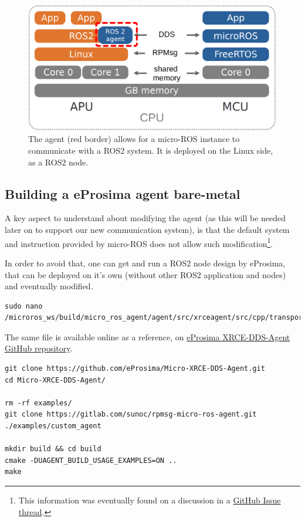 \documentclass[10pt]{article}
\begin{document}
\begin{figure}[htbp]
\centering
\includegraphics[width=.6\textwidth]{./img/map_agent.png}
\caption{\label{fig:orgf98847f}The agent (red border) allows for a micro-ROS instance to communicate with a ROS2 system. It is deployed on the Linux side, as a ROS2 node.}
\end{figure}


\subsection{Building a eProsima agent bare-metal}
\label{sec:org75a5446}
A key aspect to understand about modifying the agent (as
this will be needed later on to support our new communication system),
is that the default system and instruction provided by micro-ROS does not
allow such modification\footnote{This information was eventually found on a discussion in a \href{https://github.com/micro-ROS/micro\_ros\_setup/issues/591}{GitHub Issue thread}.}.

In order to avoid that, one can get and run a ROS2 node design by eProsima,
that can be deployed on it's own (without other ROS2 application and nodes)
and eventually modified.


\begin{verbatim}
sudo nano /microros_ws/build/micro_ros_agent/agent/src/xrceagent/src/cpp/transport/custom/CustomAgent.cpp
\end{verbatim}
The same file is available online as a reference, on \href{https://github.com/eProsima/Micro-XRCE-DDS-Agent/blob/develop/src/cpp/transport/custom/CustomAgent.cpp}{eProsima XRCE-DDS-Agent GitHub repository}.


\begin{verbatim}
git clone https://github.com/eProsima/Micro-XRCE-DDS-Agent.git
cd Micro-XRCE-DDS-Agent/

rm -rf examples/
git clone https://gitlab.com/sunoc/rpmsg-micro-ros-agent.git ./examples/custom_agent

mkdir build && cd build
cmake -DUAGENT_BUILD_USAGE_EXAMPLES=ON ..
make
\end{verbatim}
\end{document}
